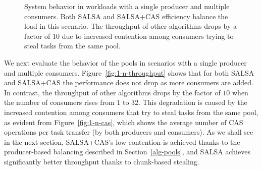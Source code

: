 \begin{figure}[htb]
	\centering
	\caption{\footnotesize{System behavior in workloads with a single producer and multiple consumers. 
	Both SALSA and SALSA+CAS efficiency balance the load in this scenario. The throughput of other algorithms drops by a factor of $10$ due to increased contention among consumers trying to steal tasks from the same pool.}}
	\label{fig:1-n-perf}
\end{figure}

We next evaluate the behavior of the pools in scenarios with a single producer and multiple consumers. 
Figure~\ref{fig:1-n-throughput} shows that for both SALSA and SALSA+CAS the performance does not drop as more consumers are added. In contrast, the throughput of other algorithms drops by the factor of $10$ when the number of consumers rises from $1$ to $32$. 
This degradation is caused by the increased contention among consumers that try to steal tasks from the same pool, as evident from Figure~\ref{fig:1-n-cas}, which shows the average number of CAS operations per task transfer (by both producers and consumers). As we shall see in the next section, SALSA+CAS's low contention is achieved thanks to the producer-based balancing described in Section~\ref{alg-pools}, and SALSA achieves significantly better throughput thanks to chunk-based stealing.

